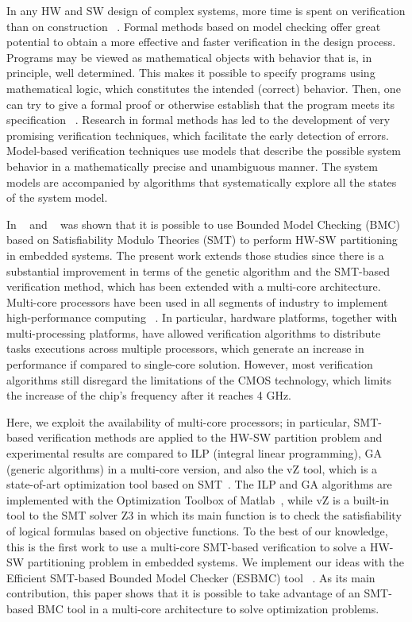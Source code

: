 In any HW and SW design of complex systems, more time is spent on verification than on construction ~\cite{Baier2008}. Formal methods based on model checking offer great potential to obtain a more effective and faster verification in the design process. Programs may be viewed as mathematical objects with behavior that is, in principle, well determined. This makes it possible to specify programs using mathematical logic, which constitutes the intended (correct) behavior. Then, one can try to give a formal proof or otherwise establish that the program meets its specification ~\cite{Clarke2009}. Research in formal methods has led to the development of very promising verification techniques, which facilitate the early detection of errors. Model-based verification techniques use models that describe the possible system behavior in a mathematically precise and unambiguous manner. The system models are accompanied by algorithms that systematically explore all the states of the system model.

In ~\cite{Trindade2015} and ~\cite{Trindade2014} was shown that it is possible to use Bounded Model Checking (BMC) based on Satisfiability Modulo Theories (SMT) to perform HW-SW partitioning in embedded systems. The present work extends those studies since there is a substantial improvement in terms of the genetic algorithm and the SMT-based verification method, which has been extended with a multi-core architecture. Multi-core processors have been used in all segments of industry to implement high-performance computing ~\cite{Wu2014}. In particular, hardware platforms, together with multi-processing platforms, have allowed verification algorithms to distribute tasks executions across multiple processors, which generate an increase in performance if compared to single-core solution. However, most verification algorithms still disregard the limitations of the CMOS technology, which limits the increase of the chip’s frequency after it reaches 4 GHz.

Here, we exploit the availability of multi-core processors; in particular, SMT-based verification methods are applied to the HW-SW partition problem and experimental results are compared to ILP (integral linear programming), GA (generic algorithms) in a multi-core version, and also the vZ tool, which is a state-of-art optimization tool based on SMT~\cite{Bjorner2015}. The ILP and GA algorithms are implemented with the Optimization Toolbox of Matlab~\cite{OpenMP1998}, while vZ is a built-in tool to the SMT solver Z3 in which its main function is to check the satisfiability of logical formulas based on objective functions. To the best of our knowledge, this is the first work to use a multi-core SMT-based verification to solve a HW-SW partitioning problem in embedded systems. We implement our ideas with the Efficient SMT-based Bounded Model Checker (ESBMC) tool ~\cite{Cordeiro2012}. As its main contribution, this paper shows that it is possible to take advantage of an SMT-based BMC tool in a multi-core architecture to solve optimization problems.

